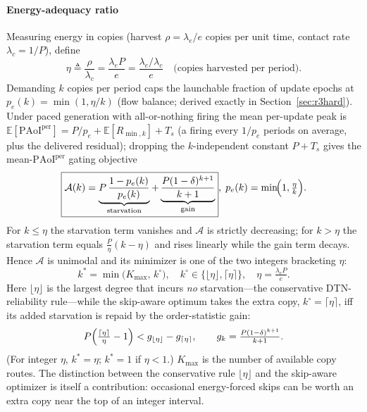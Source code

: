 \documentclass[twocolumn,3p,times,procedia]{elsarticle}
\newcommand{\PAoIper}{\mathrm{PAoI}^{\mathrm{per}}}
\newcommand{\E}{\mathbb{E}}
\newcommand{\peff}{p_e}
\newcommand{\kstar}{k^{\ast}}
\begin{document}
\paragraph*{Energy-adequacy ratio}
Measuring energy in copies (harvest $\rho=\lambda_e/e$ copies per unit
time, contact rate $\lambda_c=1/P$), define
\begin{equation}
\eta\triangleq\frac{\rho}{\lambda_c}=\frac{\lambda_e P}{e}
=\frac{\lambda_e/\lambda_c}{e}\quad\text{(copies harvested per period).}
\end{equation}
Demanding $k$ copies per period caps the launchable fraction of update
epochs at $\peff(k)=\min(1,\eta/k)$ (flow balance; derived exactly in
Section~\ref{sec:r3hard}). Under paced generation with all-or-nothing
firing the mean per-update peak is
$\E[\PAoIper]=P/\peff+\E[R_{\min,k}]+T_s$ (a firing every $1/\peff$
periods on average, plus the delivered residual); dropping the
$k$-independent constant $P+T_s$ gives the
mean-$\PAoIper$ gating objective
\begin{equation}\label{eq:obj}
\boxed{\mathcal{A}(k)=
\underbrace{P\,\frac{1-\peff(k)}{\peff(k)}}_{\text{starvation}}
+\underbrace{\frac{P(1-\delta)^{k+1}}{k+1}}_{\text{gain}}}
,\;\peff(k)=\min\!\Bigl(1,\tfrac{\eta}{k}\Bigr).
\end{equation}
For $k\le\eta$ the starvation term vanishes and $\mathcal{A}$ is strictly
decreasing; for $k>\eta$ the starvation term equals
$\frac{P}{\eta}(k-\eta)$ and rises linearly while the gain term decays.
Hence $\mathcal{A}$ is unimodal and its minimizer is one of the two
integers bracketing $\eta$:
\begin{equation}\label{eq:kstar}
\boxed{\;\kstar=\min\!\bigl(K_{\max},\,k^{\circ}\bigr),\quad
k^{\circ}\in\{\lfloor\eta\rfloor,\lceil\eta\rceil\},\quad
\eta=\tfrac{\lambda_e P}{e}.\;}
\end{equation}
Here $\lfloor\eta\rfloor$ is the largest degree that incurs \emph{no}
starvation---the conservative DTN-reliability rule---while the skip-aware
optimum takes the extra copy, $k^{\circ}{=}\lceil\eta\rceil$, iff its
added starvation is repaid by the order-statistic gain:
\begin{equation}\label{eq:ceiltest}
P\Bigl(\tfrac{\lceil\eta\rceil}{\eta}-1\Bigr)<g_{\lfloor\eta\rfloor}-g_{\lceil\eta\rceil},
\qquad g_k=\tfrac{P(1-\delta)^{k+1}}{k+1}.
\end{equation}
(For integer $\eta$, $\kstar{=}\eta$; $\kstar{=}1$ if $\eta<1$.)
$K_{\max}$ is the number of available copy routes. The
distinction between the conservative rule $\lfloor\eta\rfloor$ and the
skip-aware optimizer is itself a contribution: occasional energy-forced
skips can be worth an extra copy near the top of an integer interval.
\end{document}
